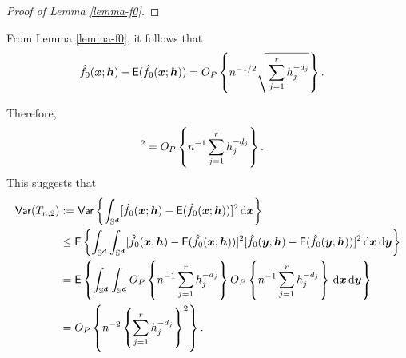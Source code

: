 \documentclass[oneside,11pt]{article}
\begin{document}
\begin{proof}[Proof of Lemma \ref{lemma-f0}]

\end{proof}

\begin{remark}
    From Lemma \ref{lemma-f0}, it follows that
    \begin{align*}
        \hat{f}_{0}(\boldsymbol{x};{\boldsymbol{h}}) - \mathsf{E} (\hat{f}_{0}(\boldsymbol{x};{\boldsymbol{h}})) &= O_P \left\{n^{-1/2} \sqrt{\sum_{j=1}^{r} h_j^{-d_j}}\right\}.
    \end{align*}
\end{remark}
Therefore,
\begin{align*}
    [\hat{f}_{0}(\bx;\bh) - \mathsf{E} (\hat{f}_{0}(\bx;\bh))]^2 &= O_P \lrb{n^{-1} \sum_{j=1}^{r} h_j^{-d_j}}.
\end{align*}
This suggests that
\begin{align*}
    \mathsf{Var} (T_{n,2}) &:= \mathsf{Var}\left\{\int_{\mathbb{S}^{\boldsymbol{d}}} [ \hat{f}_{0}(\boldsymbol{x};{\boldsymbol{h}}) - \mathsf{E} (\hat{f}_{0}(\boldsymbol{x};{\boldsymbol{h}})) ]^2 \,\mathrm{d} \boldsymbol{x}\right\} \\
    &\le \mathsf{E}\left\{\int_{\mathbb{S}^{\boldsymbol{d}}} \int_{\mathbb{S}^{\boldsymbol{d}}} [ \hat{f}_{0}(\boldsymbol{x};{\boldsymbol{h}}) - \mathsf{E} (\hat{f}_{0}(\boldsymbol{x};{\boldsymbol{h}})) ]^2 [ \hat{f}_{0}(\boldsymbol{y};{\boldsymbol{h}}) - \mathsf{E} (\hat{f}_{0}(\boldsymbol{y};{\boldsymbol{h}})) ]^2 \,\mathrm{d} \boldsymbol{x} \,\mathrm{d} \boldsymbol{y}\right\} \\
    &= \mathsf{E}\left\{\int_{\mathbb{S}^{\boldsymbol{d}}} \int_{\mathbb{S}^{\boldsymbol{d}}} O_P \left\{n^{-1} \sum_{j=1}^{r} h_j^{-d_j}\right\} O_P \left\{n^{-1} \sum_{j=1}^{r} h_j^{-d_j}\right\} \,\mathrm{d} \boldsymbol{x} \,\mathrm{d} \boldsymbol{y}\right\} \\
    &= O_P \left\{n^{-2} \left\{\sum_{j=1}^{r} h_j^{-d_j}\right\}^2\right\}.
\end{align*}
\end{document}
